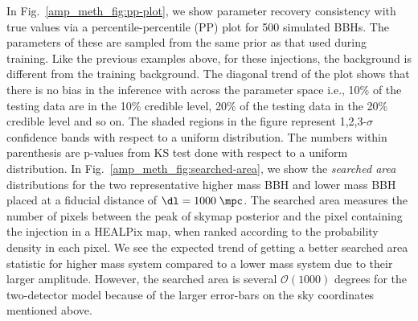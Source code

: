 \begin{refsection}
In Fig.~\ref{amp_meth_fig:pp-plot}, we show parameter recovery consistency with true values via a percentile-percentile (PP) plot for 500 simulated BBHs. 
The parameters of these are sampled from the same prior as that used during training.
Like the previous examples above, for these injections, the background is different from the training background.
The diagonal trend of the plot shows that there is no bias in the inference with {\amplfi} across the parameter space i.e., 10\% of the testing data are in the 10\% credible level, 20\% of the testing data in the 20\% credible level and so on. 
The shaded regions in the figure represent 1,2,3-$\sigma$ confidence bands with respect to a uniform distribution. 
The numbers within parenthesis are p-values from KS test done with respect to a uniform distribution.
In Fig.~\ref{amp_meth_fig:searched-area}, we show the \emph{searched area} distributions for the two representative higher mass BBH and lower mass BBH placed at a fiducial distance of $\dl = 1000\;\mpc$. 
The searched area measures the number of pixels between the peak of skymap posterior and the pixel containing the injection in a HEALPix map, when ranked according to the probability density in each pixel. 
We see the expected trend of getting a better searched area statistic for higher mass system compared to a lower mass system due to their larger amplitude. 
However, the searched area is several $\mathcal{O}(1000)$ degrees for the two-detector model because of the larger error-bars on the sky coordinates mentioned above.


\end{refsection}
